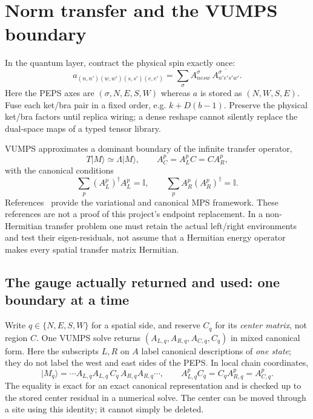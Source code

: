\documentclass[11pt]{article}
\newcommand{\id}{\mathbb I}
\begin{document}
\section{Norm transfer and the VUMPS boundary}
In the quantum layer, contract the physical spin exactly once:
\begin{equation}
 a_{(n,n')(w,w')(s,s')(e,e')}=
 \sum_\sigma A^\sigma_{n e s w}\,
              \overline{A^\sigma_{n'e's'w'}}.
\end{equation}
Here the PEPS axes are $(\sigma,N,E,S,W)$ whereas $a$ is stored as $(N,W,S,E)$.
Fuse each ket/bra pair in a fixed order, e.g. $k+D(b-1)$. Preserve the physical
ket/bra factors until replica wiring; a dense reshape cannot silently replace
the dual-space maps of a typed tensor library.

VUMPS approximates a dominant boundary of the infinite transfer operator,
\begin{equation}
 T|M\rangle\simeq\Lambda |M\rangle,
 \qquad A_C^p=A_L^p C=C A_R^p,
\end{equation}
with the canonical conditions
\begin{equation}\label{eq:canonical}
 \sum_p(A_L^p)^\dagger A_L^p=\id,
 \qquad\sum_p A_R^p(A_R^p)^\dagger=\id.
\end{equation}
References~\cite{vumps,schollwock} provide the variational and canonical MPS
framework. These references are not a proof of this project's endpoint
replacement. In a non-Hermitian transfer problem one must retain the actual
left/right environments and test their eigen-residuals, not assume that a
Hermitian energy operator makes every spatial transfer matrix Hermitian.

\ifdetailed
\subsection{The gauge actually returned and used: one boundary at a time}
Write $q\in\{N,E,S,W\}$ for a spatial side, and reserve $C_q$ for its
\emph{center matrix}, not region $C$. One VUMPS solve returns
$(A_{L,q},A_{R,q},A_{C,q},C_q)$ in mixed canonical form. Here the subscripts
$L,R$ on $A$ label canonical descriptions of \emph{one state}; they do not
label the west and east sides of the PEPS. In local chain coordinates,
\begin{equation}
 |M_q\rangle=\cdots A_{L,q}A_{L,q}\,C_q\,A_{R,q}A_{R,q}\cdots,
 \qquad A_{L,q}^p C_q=C_q A_{R,q}^p=A_{C,q}^p.
\end{equation}
The equality is exact for an exact canonical representation and is checked
up to the stored center residual in a numerical solve. The center can be
moved through a site using this identity; it cannot simply be deleted.
\end{document}
